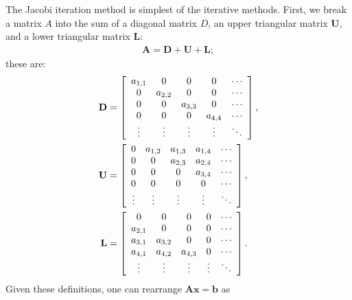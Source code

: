 The Jacobi iteration method is simplest of the iterative methods. First, we break a matrix $A$ into the sum of a diagonal matrix $D$, an upper triangular matrix $\mathbf{U}$, and a lower triangular matrix $\mathbf{L}$:
\begin{align}
  \mathbf{A} = \mathbf{D} + \mathbf{U} + \mathbf{L};
\end{align}
these are:
\begin{subequations}
\begin{align}
  \mathbf{D} &= \left[ \begin{array}{c c c c c} 
  a_{1,1}  & 0        & 0       & 0       & \cdots \\
  0        & a_{2,2}  & 0       & 0       & \cdots \\
  0        & 0        & a_{3,3} & 0       & \cdots \\
  0        & 0        & 0       & a_{4,4} & \cdots \\
  \vdots   & \vdots   & \vdots  & \vdots  & \ddots \\
  \end{array} \right] , \\
  \mathbf{U} &= \left[ \begin{array}{c c c c c} 
  0        & a_{1,2}  & a_{1,3} & a_{1,4} & \cdots \\
  0        & 0        & a_{2,3} & a_{2,4} & \cdots \\
  0        & 0        & 0       & a_{3,4} & \cdots \\
  0        & 0        & 0       & 0       & \cdots \\
  \vdots   & \vdots   & \vdots  & \vdots  & \ddots \\
  \end{array} \right] , \\
  \mathbf{L} &= \left[ \begin{array}{c c c c c} 
  0       & 0       & 0       & 0       & \cdots \\
  a_{2,1} & 0       & 0       & 0       & \cdots \\
  a_{3,1} & a_{3,2} & 0       & 0       & \cdots \\
  a_{4,1} & a_{4,2} & a_{4,3} & 0       & \cdots \\
  \vdots  & \vdots   & \vdots  & \vdots  & \ddots \\
  \end{array} \right] .
\end{align}
\end{subequations}
Given these definitions, one can rearrange $\mathbf{Ax} = \mathbf{b}$ as
